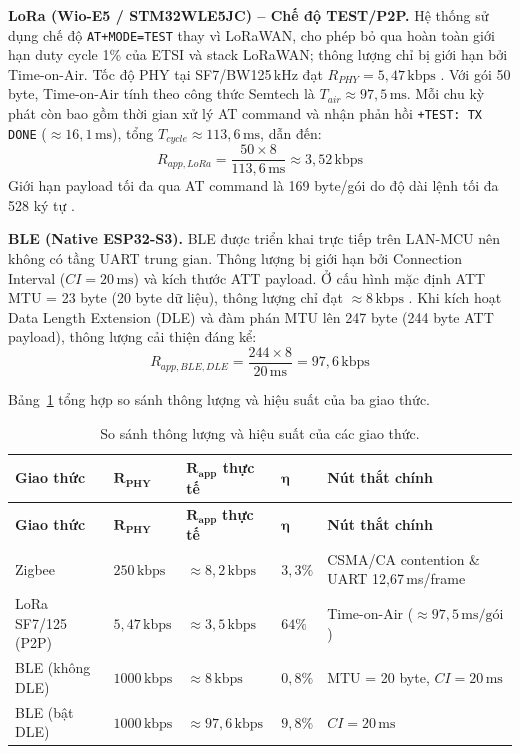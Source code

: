         \textbf{LoRa (Wio-E5 / STM32WLE5JC) -- Chế độ TEST/P2P.} Hệ thống sử dụng chế độ \texttt{AT+MODE=TEST} thay vì LoRaWAN, cho phép bỏ qua hoàn toàn giới hạn duty cycle 1\% của ETSI và stack LoRaWAN; thông lượng chỉ bị giới hạn bởi Time-on-Air. Tốc độ PHY tại SF7/BW125\,kHz đạt $R_{PHY} = 5{,}47\,\text{kbps}$ \cite{semtech_lora_design_guide}. Với gói 50 byte, Time-on-Air tính theo công thức Semtech là $T_{air} \approx 97{,}5\,\text{ms}$. Mỗi chu kỳ phát còn bao gồm thời gian xử lý AT command và nhận phản hồi \texttt{+TEST: TX DONE} ($\approx 16{,}1\,\text{ms}$), tổng $T_{cycle} \approx 113{,}6\,\text{ms}$, dẫn đến:
        \[ R_{app,LoRa} = \frac{50 \times 8}{113{,}6\,\text{ms}} \approx 3{,}52\,\text{kbps} \]
        Giới hạn payload tối đa qua AT command là 169 byte/gói do độ dài lệnh tối đa 528 ký tự \cite{seeed_wioe5_at_cmd}.
        
        \textbf{BLE (Native ESP32-S3).} BLE được triển khai trực tiếp trên LAN-MCU nên không có tầng UART trung gian. Thông lượng bị giới hạn bởi Connection Interval ($CI = 20\,\text{ms}$) và kích thước ATT payload. Ở cấu hình mặc định ATT MTU = 23 byte (20 byte dữ liệu), thông lượng chỉ đạt $\approx 8\,\text{kbps}$ \cite{bluetooth_core_v5}. Khi kích hoạt Data Length Extension (DLE) và đàm phán MTU lên 247 byte (244 byte ATT payload), thông lượng cải thiện đáng kể:
        \[ R_{app,BLE,DLE} = \frac{244 \times 8}{20\,\text{ms}} = 97{,}6\,\text{kbps} \]
        
        Bảng~\ref{tab:throughput_efficiency} tổng hợp so sánh thông lượng và hiệu suất của ba giao thức.
        
        \begin{longtable}{|p{3.2cm}|p{2.3cm}|p{2.7cm}|p{1.4cm}|p{4.2cm}|}
            \caption{So sánh thông lượng và hiệu suất của các giao thức.} \label{tab:throughput_efficiency} \\
            \hline
            \textbf{Giao thức} & $\boldsymbol{R_{PHY}}$ & $\boldsymbol{R_{app}}$ \textbf{thực tế} & $\boldsymbol{\eta}$ & \textbf{Nút thắt chính} \\ \hline
            \endfirsthead
            \hline
            \textbf{Giao thức} & $\boldsymbol{R_{PHY}}$ & $\boldsymbol{R_{app}}$ \textbf{thực tế} & $\boldsymbol{\eta}$ & \textbf{Nút thắt chính} \\ \hline
            \endhead
            \hline
            \endfoot
            \endlastfoot
            Zigbee & $250\,\text{kbps}$ & $\approx 8{,}2\,\text{kbps}$ & $3{,}3\%$ & CSMA/CA contention \& UART 12,67\,ms/frame \\ \hline
            LoRa SF7/125 (P2P) & $5{,}47\,\text{kbps}$ & $\approx 3{,}5\,\text{kbps}$ & $64\%$ & Time-on-Air ($\approx 97{,}5\,\text{ms/gói}$) \\ \hline
            BLE (không DLE) & $1000\,\text{kbps}$ & $\approx 8\,\text{kbps}$ & $0{,}8\%$ & MTU = 20 byte, $CI = 20\,\text{ms}$ \\ \hline
            BLE (bật DLE) & $1000\,\text{kbps}$ & $\approx 97{,}6\,\text{kbps}$ & $9{,}8\%$ & $CI = 20\,\text{ms}$ \\ \hline
        \end{longtable}
        
